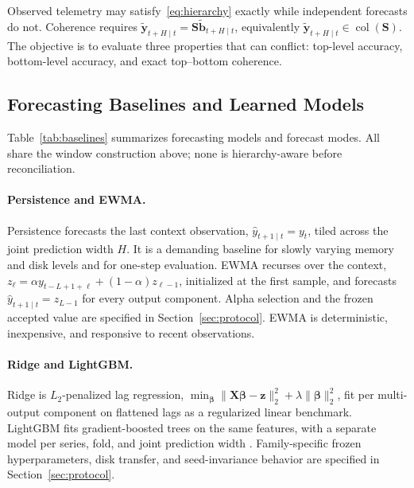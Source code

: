 \documentclass[a4paper,fleqn]{cas-dc}
\begin{document}
Observed telemetry may satisfy~\eqref{eq:hierarchy} exactly while independent
forecasts do not.
Coherence requires
$\tilde{\mathbf{y}}_{t+H\mid t}=\mathbf{S}\tilde{\mathbf{b}}_{t+H\mid t}$,
equivalently $\tilde{\mathbf{y}}_{t+H\mid t}\in\operatorname{col}(\mathbf{S})$.
The objective is to evaluate three properties that can conflict: top-level
accuracy, bottom-level accuracy, and exact top--bottom coherence.

\subsection{Forecasting Baselines and Learned Models}
\label{sec:baselines}
Table~\ref{tab:baselines} summarizes forecasting models and forecast modes.
All share the window construction above; none is hierarchy-aware before
reconciliation.


\FloatBarrier

\paragraph{Persistence and {EWMA}.}
Persistence forecasts the last context observation,
$\hat{y}_{t+1\mid t}=y_t$, tiled across the joint prediction width $H$.
It is a demanding baseline for slowly varying memory and disk levels and for
one-step evaluation.
{EWMA} recurses over the context,
$z_{\ell}=\alpha y_{t-L+1+\ell}+(1-\alpha)z_{\ell-1}$, initialized at the first
sample, and forecasts $\hat{y}_{t+1\mid t}=z_{L-1}$ for every output component.
Alpha selection and the frozen accepted value are specified in
Section~\ref{sec:protocol}.
{EWMA} is deterministic, inexpensive, and responsive to recent observations.

\paragraph{Ridge and LightGBM.}
Ridge is $L_2$-penalized lag regression,
$\min_{\boldsymbol{\beta}}\|\mathbf{X}\boldsymbol{\beta}-\mathbf{z}\|_2^2
+\lambda\|\boldsymbol{\beta}\|_2^2$,
fit per multi-output component on flattened lags as a regularized linear
benchmark.
LightGBM fits gradient-boosted trees on the same features, with a separate model
per series, fold, and joint prediction width \cite{ke2017lightgbm}.
Family-specific frozen hyperparameters, disk transfer, and seed-invariance
behavior are specified in Section~\ref{sec:protocol}.
\end{document}
